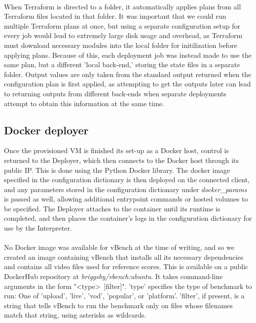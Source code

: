\documentclass{report}
\begin{document}
\paragraph{}
When Terraform is directed to a folder, it automatically applies plans from all Terraform files located in that folder. It was important that we could run multiple Terraform plans at once, but using a separate configuration setup for every job would lead to extremely large disk usage and overhead, as Terraform must download necessary modules into the local folder for initilization before applying plans. Because of this, each deployment job was instead made to use the same plan, but a different 'local back-end,' storing the state files in a separate folder. Output values are only taken from the standard output returned when the configuration plan is first applied, as attempting to get the outputs later can lead to returning outputs from different back-ends when separate deployments attempt to obtain this information at the same time.


\subsection{Docker deployer}
Once the provisioned VM is finished its set-up as a Docker host, control is returned to the Deployer, which then connects to the Docker host through its public IP. This is done using the Python Docker library. The docker image specified in the configuration dictionary is then deployed on the connected client, and any parameters stored in the configuration dictionary under \textit{docker\_params} is passed as well, allowing additional entrypoint commands or hosted volumes to be specified. The Deployer attaches to the container until its runtime is completed, and then places the container's logs in the configuration dictionary for use by the Interpreter.

\paragraph{}
No Docker image was available for vBench at the time of writing, and so we created an image containing vBench that installs all its necessary dependencies and contains all video files used for reference scores. This is available on a public DockerHub repository at \textit{briggsby/vbench:ubuntu}. It takes command-line arguments in the form "\textless type\textgreater \ [filter]". 'type' specifies the type of benchmark to run: One of 'upload', 'live', 'vod', 'popular', or 'platform'. 'filter', if present, is a string that tells vBench to run the benchmark only on files whose filenames match that string, using asterisks as wildcards.
\end{document}
